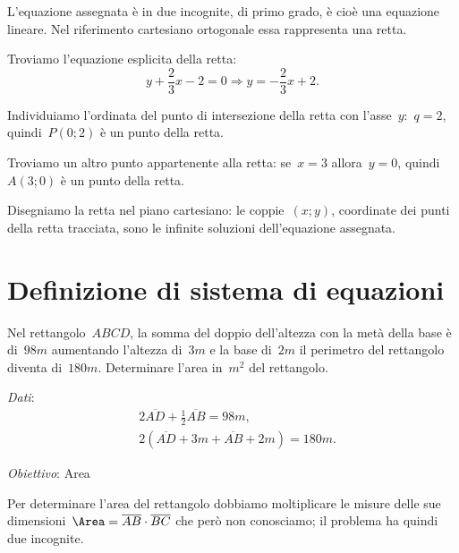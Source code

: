L'equazione assegnata è in due incognite, di primo
grado, è cioè una equazione lineare. Nel riferimento cartesiano
ortogonale essa rappresenta una retta.

Troviamo l'equazione esplicita della retta:
\[y+\frac{2}{3}x-2=0\Rightarrow y=-{\frac{2}{3}}x+2.\]

Individuiamo l'ordinata del punto di intersezione della
retta con l'asse~\(y\):~\(q=2\), quindi~\(P(0;2)\) è un
punto della retta.

Troviamo un altro punto appartenente alla retta: se~\(x=3\) allora~\(y=0\),
quindi~\(A(3;0)\) è un punto della retta.

Disegniamo la retta nel piano cartesiano: le coppie~\((x;y)\), coordinate
dei punti della retta tracciata, sono le infinite soluzioni
dell'equazione assegnata.\vspace{1.10ex}


\section{Definizione di sistema di equazioni}
\label{sec:sist_definizione}

\begin{problema}
\label{pr:22.1}
Nel rettangolo~\(ABCD\), la somma del doppio dell'altezza con la metà della base
è di~\(98\unit{m}\) aumentando l'altezza di~\(3\unit{m}\) e la base di~\(2\unit{m}\) 
il perimetro del rettangolo diventa di~\(180\unit{m}\). 
Determinare l'area in~\(\unit{m}^{2}\) del rettangolo.
\end{problema}
\begin{multicols}{2}
\emph{Dati}:
\begin{align*}
&2\overline{AD}+\frac{1}{2}\overline{AB}=98\unit{m},\\
&2(\overline{AD}+3m+\overline{AB}+2m)=180\unit{m}.
\end{align*}

\emph{Obiettivo}: Area

\begin{center}
\begin{inaccessibleblock}
 
 \end{inaccessibleblock}
\end{center}
\end{multicols}

Per determinare l'area del rettangolo dobbiamo moltiplicare le misure 
delle sue dimensioni~\(\Area=\overline{AB}\cdot\overline{BC}\)
che però non conosciamo; il problema ha quindi due incognite.

